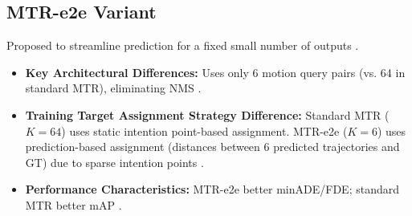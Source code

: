 \subsection{MTR-e2e Variant}
Proposed to streamline prediction for a fixed small number of outputs \cite{Shi2022MTR}.
\begin{itemize}
    \item \textbf{Key Architectural Differences:} Uses only 6 motion query pairs (vs. 64 in standard MTR), eliminating NMS \cite{Shi2022MTR}.
    \item \textbf{Training Target Assignment Strategy Difference:} Standard MTR ($K=64$) uses static intention point-based assignment. MTR-e2e ($K=6$) uses prediction-based assignment (distances between 6 predicted trajectories and GT) due to sparse intention points \cite{Shi2022MTR}.
    \item \textbf{Performance Characteristics:} MTR-e2e better minADE/FDE; standard MTR better mAP \cite{Shi2022MTR}.
\end{itemize}

